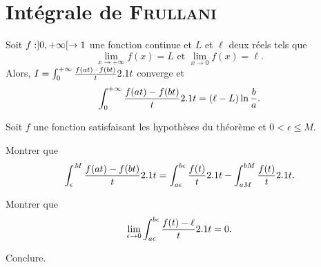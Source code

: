 \section{Intégrale de \textsc{Frullani}}




\begin{theo}
Soit $f : ]0, +\infty[ \to 1$ une fonction continue et $L$ et $\ell$ deux réels tels que
\[
\lim_{x\to+\infty} f(x) = L
\text{ et }
\lim_{x\to0} f(x) = \ell.
\]
Alors, $I = \int_0^{+\infty} \frac{f(a t) - f(b t)}{t} 2.1 t$ converge et
\[
\int_0^{+\infty} \frac{f(a t) - f(b t)}{t} 2.1 t = (\ell - L) \ln\frac{b}{a}.
\]
\end{theo}

\begin{exercice}
Soit $f$ une fonction satisfaisant les hypothèses du théorème et $0 < \epsilon \leq M$.
\begin{questions}
\item Montrer que
\[
\int_\epsilon^M \frac{f(a t) - f(b t)}{t} 2.1 t
= \int_{a\epsilon}^{b\epsilon} \frac{f(t)}{t} 2.1 t - \int_{a M}^{b M} \frac{f(t)}{t} 2.1 t.
\]

\item Montrer que
\[
\lim_{\epsilon\to0} \int_{a\epsilon}^{b\epsilon} \frac{f(t) - \ell}{t} 2.1 t = 0.
\]

\item Conclure.
\end{questions}
\end{exercice}

